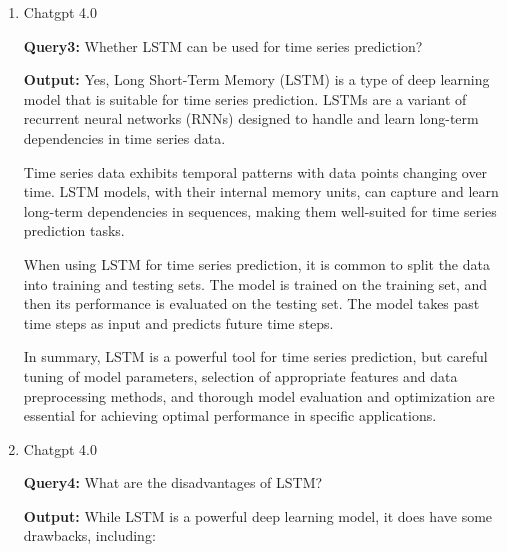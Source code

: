 \documentclass[12pt]{article}  %
\begin{document}
\begin{spacing}{1.2}
\begin{enumerate}
        \item {
            Chatgpt 4.0
            \begin{tcolorbox}[colback=gray!20, boxrule=0pt] %
            \textbf{Query3:} Whether LSTM can be used for time series prediction?
            \end{tcolorbox}
            \begin{tcolorbox}[colback=gray!5, boxrule=0pt]
            \textbf{Output:} Yes, Long Short-Term Memory (LSTM) is a type of deep learning model that is suitable for time series prediction. LSTMs are a variant of recurrent neural networks (RNNs) designed to handle and learn long-term dependencies in time series data.
            
            Time series data exhibits temporal patterns with data points changing over time. LSTM models, with their internal memory units, can capture and learn long-term dependencies in sequences, making them well-suited for time series prediction tasks.
            \end{tcolorbox}

            \begin{tcolorbox}[colback=gray!5, boxrule=0pt]
            When using LSTM for time series prediction, it is common to split the data into training and testing sets. The model is trained on the training set, and then its performance is evaluated on the testing set. The model takes past time steps as input and predicts future time steps.
            
            In summary, LSTM is a powerful tool for time series prediction, but careful tuning of model parameters, selection of appropriate features and data preprocessing methods, and thorough model evaluation and optimization are essential for achieving optimal performance in specific applications.
            \end{tcolorbox}

        }

        \item {
            Chatgpt 4.0
            \begin{tcolorbox}[colback=gray!20, boxrule=0pt] %
            \textbf{Query4:} What are the disadvantages of LSTM?
            \end{tcolorbox}
            \begin{tcolorbox}[colback=gray!5, boxrule=0pt]
            \textbf{Output:} While LSTM is a powerful deep learning model, it does have some drawbacks, including:


\end{tcolorbox}}
\end{enumerate}
\end{spacing}
\end{document}
